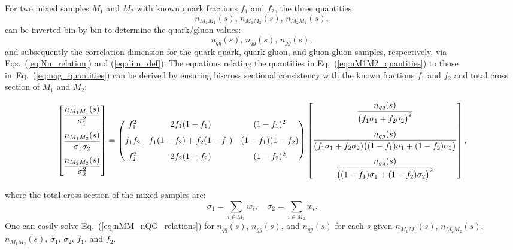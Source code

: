 \documentclass[aps,prd,twocolumn,preprintnumbers,nofootinbib,longbibliography,floatfix]{revtex4-1}
\DeclareRobustCommand{\Eq}[1]{Eq.~(\ref{#1})}
\DeclareRobustCommand{\Eqs}[2]{Eqs.~(\ref{#1}) and (\ref{#2})}
\begin{document}
For two mixed samples $M_1$ and $M_2$ with known quark fractions $f_1$ and $f_2$, the three quantities:
%
\begin{equation}
\label{eq:nM1M2_quantities}
n_{M_1 M_1}(s),\, n_{M_1 M_2}(s),\, n_{M_2 M_2}(s),
\end{equation}
%
can be inverted bin by bin to determine the quark/gluon values:
%
\begin{equation}
\label{eq:nqg_quantities}
n_{qq}(s),\, n_{qg}(s),\, n_{gg}(s),
\end{equation}
and subsequently the correlation dimension for the quark-quark, quark-gluon, and gluon-gluon samples, respectively, via \Eqs{eq:Nn_relation}{eq:dim_def}.
%
The equations relating the quantities in \Eq{eq:nM1M2_quantities} to those in~\Eq{eq:nqg_quantities} can be derived by ensuring bi-cross sectional consistency with the known fractions $f_1$ and $f_2$ and total cross section of $M_1$ and $M_2$:
%
\begin{widetext}
\begin{equation}
\label{eq:nMM_nQG_relations}
\begin{bmatrix}
\vspace{0.1in}\displaystyle\frac{n_{M_1M_1}(s)}{\sigma_1^2}\\
\vspace{0.1in}\displaystyle\frac{n_{M_1M_2}(s)}{\sigma_1\sigma_2}\\
\displaystyle\frac{n_{M_2M_2}(s)}{\sigma_2^2}
\end{bmatrix}
=
\begin{pmatrix}
\vspace{0.1in} f_1^2 & 2f_1(1-f_1) & (1-f_1)^2 \\
\vspace{0.1in} f_1f_2 & f_1(1-f_2)+f_2(1-f_1) & (1-f_1)(1-f_2) \\
f_2^2 & 2f_2(1-f_2) & (1-f_2)^2
\end{pmatrix}
\begin{bmatrix}
\vspace{0.1in}\displaystyle\frac{n_{qq}(s)}{\big(f_1\sigma_1+f_2\sigma_2\big)^2}\\
\vspace{0.1in}\displaystyle\frac{n_{qg}(s)}{(f_1\sigma_1+f_2\sigma_2)\big((1-f_1)\sigma_1+(1-f_2)\sigma_2\big)}\\
\displaystyle\frac{n_{gg}(s)}{\big((1-f_1)\sigma_1+(1-f_2)\sigma_2\big)^2}
\end{bmatrix},
\end{equation}
\end{widetext}
%
where the total cross section of the mixed samples are:
%
\begin{equation}
\sigma_1=\sum_{i\in M_1}w_i,\quad \sigma_2=\sum_{i\in M_2}w_i.
\end{equation}
%
One can easily solve \Eq{eq:nMM_nQG_relations} for $n_{qq}(s)$, $n_{gg}(s)$, and $n_{qg}(s)$ for each $s$ given $n_{M_1M_1}(s)$, $n_{M_2M_2}(s)$, $n_{M_1M_2}(s)$, $\sigma_1$, $\sigma_2$, $f_1$, and $f_2$.
\end{document}
